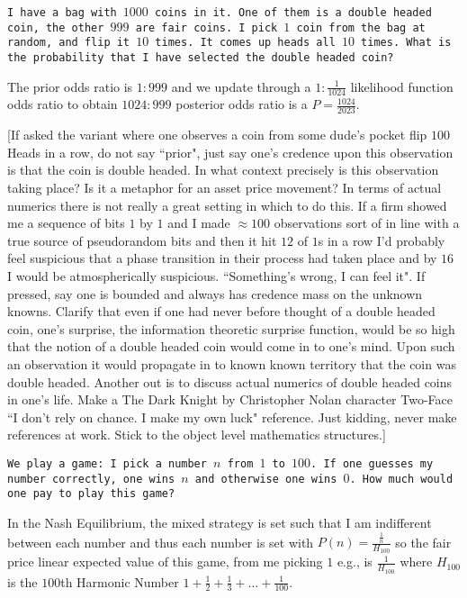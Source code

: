 \texttt{I have a bag with $1000$ coins in it. One of them is a double headed coin, the other $999$ are fair coins. I pick $1$ coin from the bag at random, and flip it $10$ times. It comes up heads all $10$ times. What is the probability that I have selected the double headed coin?}

The prior odds ratio is $1:999$ and we update through a $1:\frac{1}{1024}$ likelihood function odds ratio to obtain $1024:999$ posterior odds ratio is a $P=\boxed{\frac{1024}{2023}}$.

[If asked the variant where one observes a coin from some dude's pocket flip $100$ Heads in a row, do not say ``prior", just say one's credence upon this observation is that the coin is double headed. In what context precisely is this observation taking place? Is it a metaphor for an asset price movement? In terms of actual numerics there is not really a great setting in which to do this. If a firm showed me a sequence of bits $1$ by $1$ and I made $\approx 100$ observations sort of in line with a true source of pseudorandom bits and then it hit $12$ of $1$s in a row I'd probably feel suspicious that a phase transition in their process had taken place and by $16$ I would be atmospherically suspicious. ``Something's wrong, I can feel it". If pressed, say one is bounded and always has credence mass on the unknown knowns. Clarify that even if one had never before thought of a double headed coin, one's surprise, the information theoretic surprise function, would be so high that the notion of a double headed coin would come in to one's mind. Upon such an observation it would propagate in to known known territory that the coin was double headed. Another out is to discuss actual numerics of double headed coins in one's life. Make a The Dark Knight by Christopher Nolan character Two-Face ``I don't rely on chance. I make my own luck" reference. Just kidding, never make references at work. Stick to the object level mathematics structures.]

\texttt{We play a game: I pick a number $n$ from $1$ to $100$. If one guesses my number correctly, one wins $n$ and otherwise one wins $0$. How much would one pay to play this game?}

In the Nash Equilibrium, the mixed strategy is set such that I am indifferent between each number and thus each number is set with $P(n)=\frac{\frac{1}{n}}{H_{100}}$ so the fair price linear expected value of this game, from me picking $1$ e.g., is $\boxed{\frac{1}{H_{100}}}$ where $H_{100}$ is the $100$th Harmonic Number $1+\frac{1}{2}+\frac{1}{3}+\dots+\frac{1}{100}$.

